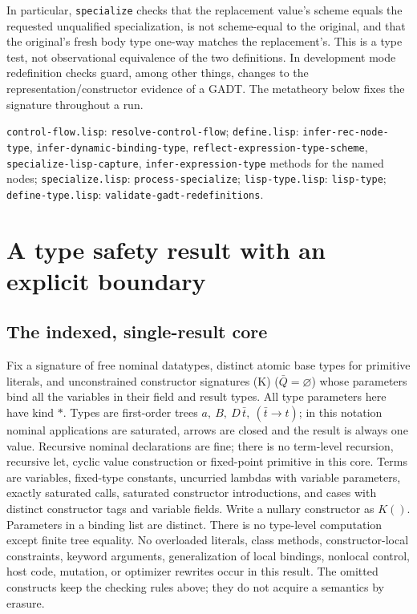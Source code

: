 \documentclass[11pt]{article}
\theoremstyle{definition}
\newcommand{\code}[1]{\texttt{#1}}
\newcommand{\src}[1]{\nolinkurl{#1}}
\newcommand{\arr}{\mathbin{\to}}
\begin{document}
In particular, \code{specialize} checks that the replacement value's scheme
equals the requested unqualified specialization, is not scheme-equal to
the original, and that the original's fresh body type one-way matches the
replacement's. This is a type test, not observational equivalence of the
two definitions. In development mode redefinition checks guard, among
other things, changes to the representation/constructor evidence of a
GADT. The metatheory below fixes the signature throughout a run.

\sources \src{control-flow.lisp}: \src{resolve-control-flow};
\src{define.lisp}: \src{infer-rec-node-type}, \src{infer-dynamic-binding-type},
\src{reflect-expression-type-scheme}, \src{specialize-lisp-capture},
\src{infer-expression-type} methods for the named nodes;
\src{specialize.lisp}: \src{process-specialize}; \src{lisp-type.lisp}:
\src{lisp-type}; \src{define-type.lisp}: \src{validate-gadt-redefinitions}.

\section{A type safety result with an explicit boundary}\label{sec:safety}

\subsection{The indexed, single-result core}
Fix a signature of free nominal datatypes, distinct atomic base types for
primitive literals, and unconstrained constructor signatures (K)
($\bar Q=\varnothing$) whose parameters bind all the variables in their
field and result types. All type parameters here have kind $*$. Types are
first-order trees $a,\ B,\ D\,\bar t,\ (\bar t\arr t)$; in this notation
nominal applications are saturated, arrows are closed and the result is
always one value. Recursive nominal declarations are fine; there is no
term-level recursion, recursive let, cyclic value construction or
fixed-point primitive in this core. Terms are variables, fixed-type
constants, uncurried lambdas with variable parameters, exactly saturated
calls, saturated constructor introductions, and cases with distinct
constructor tags and variable fields. Write a nullary constructor as
$K()$. Parameters in a binding list are distinct. There is no type-level
computation except finite tree equality. No overloaded literals, class
methods, constructor-local constraints, keyword arguments, generalization
of local bindings, nonlocal control, host code, mutation, or optimizer
rewrites occur in this result. The omitted constructs keep the checking
rules above; they do not acquire a semantics by erasure.
\end{document}
